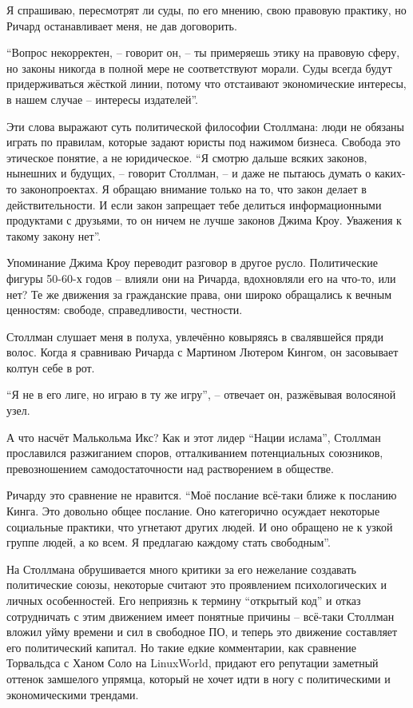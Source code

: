 Я спрашиваю, пересмотрят ли суды, по его мнению, свою правовую практику, но Ричард останавливает меня, не дав договорить.

\enquote{Вопрос некорректен, -- говорит он, -- ты примеряешь этику на правовую сферу, но законы никогда в полной мере не соответствуют морали. Суды всегда будут придерживаться жёсткой линии, потому что отстаивают экономические интересы, в нашем случае -- интересы издателей}.

Эти слова выражают суть политической философии Столлмана: люди не обязаны играть по правилам, которые задают юристы под нажимом бизнеса. Свобода это этическое понятие, а не юридическое. \enquote{Я смотрю дальше всяких законов, нынешних и будущих, -- говорит Столлман, -- и даже не пытаюсь думать о каких-то законопроектах. Я обращаю внимание только на то, что закон делает в действительности. И если закон запрещает тебе делиться информационными продуктами с друзьями, то он ничем не лучше законов Джима Кроу. Уважения к такому закону нет}.

Упоминание Джима Кроу переводит разговор в другое русло. Политические фигуры 50-60-х годов -- влияли они на Ричарда, вдохновляли его на что-то, или нет? Те же движения за гражданские права, они широко обращались к вечным ценностям: свободе, справедливости, честности.

Столлман слушает меня в полуха, увлечённо ковыряясь в свалявшейся пряди волос. Когда я сравниваю Ричарда с Мартином Лютером Кингом, он засовывает колтун себе в рот.

\enquote{Я не в его лиге, но играю в ту же игру}, -- отвечает он, разжёвывая волосяной узел.

А что насчёт Малькольма Икс? Как и этот лидер \enquote{Нации ислама}, Столлман прославился разжиганием споров, отталкиванием потенциальных союзников, превозношением самодостаточности над растворением в обществе.

Ричарду это сравнение не нравится. \enquote{Моё послание всё-таки ближе к посланию Кинга. Это довольно общее послание. Оно категорично осуждает некоторые социальные практики, что угнетают других людей. И оно обращено не к узкой группе людей, а ко всем. Я предлагаю каждому стать свободным}.

На Столлмана обрушивается много критики за его нежелание создавать политические союзы, некоторые считают это проявлением психологических и личных особенностей. Его неприязнь к термину \enquote{открытый код} и отказ сотрудничать с этим движением имеет понятные причины -- всё-таки Столлман вложил уйму времени и сил в свободное ПО, и теперь это движение составляет его политический капитал. Но такие едкие комментарии, как сравнение Торвальдса с Ханом Соло на LinuxWorld, придают его репутации заметный оттенок замшелого упрямца, который не хочет идти в ногу с политическими и экономическими трендами.

